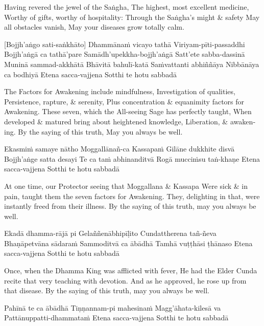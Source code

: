 \begin{english}
  Having revered the jewel of the Saṅgha,
  The highest, most excellent medicine,
  Worthy of gifts, worthy of hospitality:
  Through the Saṅgha’s might \& safety
  May all obstacles vanish,
  May your diseases grow totally calm.
\end{english}

\suttaRef{[MJG]}

[Bojjh’aṅgo sati-saṅkhāto]
Dhammānaṁ vicayo tathā
Viriyam-pīti-passaddhi
Bojjh’aṅgā ca tathā’pare
Samādh’upekkha-bojjh’aṅgā
Satt’ete sabba-dassinā
Muninā sammad-akkhātā
Bhāvitā bahulī-katā
Saṁvattanti abhiññāya
Nibbānāya ca bodhiyā
Etena sacca-vajjena
Sotthi te hotu sabbadā

\begin{english}
  The Factors for Awakening include mindfulness,
  Investigation of qualities,
  Persistence, rapture, \& serenity,
  Plus concentration \& equanimity factors for Awakening.
  These seven, which the All-seeing Sage has perfectly taught,
  When developed \& matured bring about heightened knowledge, Liberation, \& awakening.
  By the saying of this truth,
  May you always be well.
\end{english}

Ekasmiṁ samaye nātho
Moggallānañ-ca Kassapaṁ
Gilāne dukkhite disvā
Bojjh’aṅge satta desayi
Te ca taṁ abhinanditvā
Rogā mucciṁsu taṅ-khaṇe
Etena sacca-vajjena
Sotthi te hotu sabbadā

\begin{english}
  At one time, our Protector seeing that Moggallana \& Kassapa
  Were sick \& in pain, taught them the seven factors for Awakening.
  They, delighting in that, were instantly freed from their illness.
  By the saying of this truth, may you always be well.
\end{english}

Ekadā dhamma-rājā pi
Gelaññenābhipīḷito
Cundattherena tañ-ñeva
Bhaṇāpetvāna sādaraṁ
Sammoditvā ca ābādhā
Tamhā vuṭṭhāsi ṭhānaso
Etena sacca-vajjena
Sotthi te hotu sabbadā

\begin{english}
  Once, when the Dhamma King was afflicted with fever,
  He had the Elder Cunda recite that very teaching with devotion.
  And as he approved, he rose up from that disease.
  By the saying of this truth, may you always be well.
\end{english}

Pahīnā te ca ābādhā
Tiṇṇannam-pi mahesinaṁ
Magg’āhata-kilesā va
Pattānuppatti-dhammataṁ
Etena sacca-vajjena
Sotthi te hotu sabbadā

